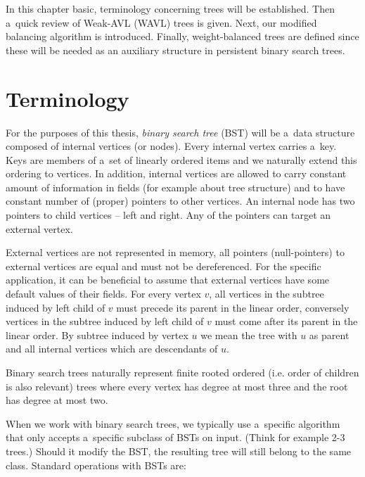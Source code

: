 In this chapter basic, terminology concerning trees will be established. Then a~quick review of Weak-AVL (WAVL) trees is given. Next, our modified balancing algorithm is introduced. Finally, weight-balanced trees are defined since these will be needed as an auxiliary structure in persistent binary search trees.

\section{Terminology}

For the purposes of this thesis, \emph{binary search tree} (BST) will be a~data structure composed of internal vertices (or nodes). Every internal vertex carries a~key. Keys are members of a~set of linearly ordered items and we naturally extend this ordering to vertices. In addition, internal vertices are allowed to carry constant amount of information in fields (for example about tree structure) and to have constant number of (proper) pointers to other vertices. An internal node has two pointers to child vertices -- left and right. Any of the pointers can target an external vertex. 

External vertices are not represented in memory, all pointers (null-pointers) to external vertices are equal and must not be dereferenced. For the specific application, it can be beneficial to assume that external vertices have some default values of their fields. For every vertex $v$, all vertices in the subtree induced by left child of $v$ must precede its parent in the linear order, conversely vertices in the subtree induced by left child of $v$ must come after its parent in the linear order. By subtree induced by vertex $u$ we mean the tree with $u$ as parent and all internal vertices which are descendants of $u$.

Binary search trees naturally represent finite rooted ordered (i.e. order of children is also relevant) trees where every vertex has degree at most three and the root has degree at most two.

When we work with binary search trees, we typically use a~specific algorithm that only accepts a~specific subclass of BSTs on input. (Think for example 2-3 trees.) Should it modify the BST, the resulting tree will still belong to the same class. Standard operations with BSTs are:


